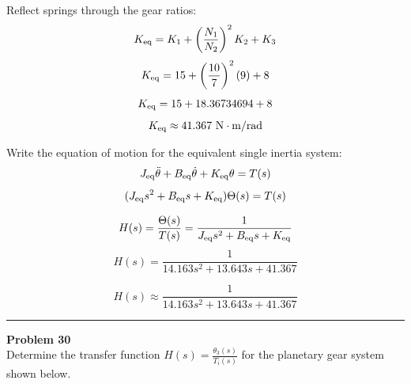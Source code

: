 Reflect springs through the gear ratios:
\[
K_{\rm eq} = K_1 + \left(\frac{N_1}{N_2}\right)^2 K_2 + K_3
\]
\[
K_{\rm eq} = 15 + \left(\frac{10}{7}\right)^2 (9) + 8
\]
\[
K_{\rm eq} = 15 + 18.36734694 + 8
\]
\[
K_{\rm eq} \approx 41.367~\mathrm{N\cdot m/rad}
\]

Write the equation of motion for the equivalent single inertia system:
\[
J_{\rm eq} \ddot{\theta} + B_{\rm eq} \dot{\theta} + K_{\rm eq} \theta = T(s)
\]
\[
(J_{\rm eq} s^2 + B_{\rm eq} s + K_{\rm eq}) \Theta(s) = T(s)
\]

\[
H(s) = \frac{\Theta(s)}{T(s)} = \frac{1}{J_{\rm eq} s^2 + B_{\rm eq} s + K_{\rm eq}}
\]
\[
H(s) = \frac{1}{14.163 s^2 + 13.643 s + 41.367}
\]

\[
\boxed{H(s) \approx \frac{1}{14.163 s^2 + 13.643 s + 41.367}}
\]

\newpage

\noindent\rule{\textwidth}{1pt}
\noindent\textbf{Problem 30} \hfill
\\ Determine the transfer function \(H(s) = \frac{\theta_3(s)}{T_i(s)}\) for the planetary gear system shown below.

